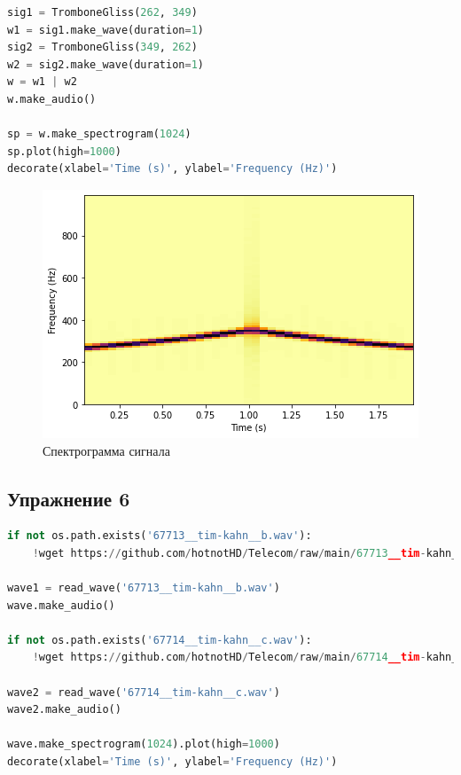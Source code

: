 \begin{lstlisting}[language=Python]
sig1 = TromboneGliss(262, 349)
w1 = sig1.make_wave(duration=1)
sig2 = TromboneGliss(349, 262)
w2 = sig2.make_wave(duration=1)
w = w1 | w2
w.make_audio()

sp = w.make_spectrogram(1024)
sp.plot(high=1000)
decorate(xlabel='Time (s)', ylabel='Frequency (Hz)')
\end{lstlisting}

\begin{figure}[H]
	\begin{center}
		\includegraphics[scale=1]{fig/lab03/lab03_13.png}
		\caption{Спектрограмма сигнала}
	\end{center}
\end{figure}

\subsection{Упражнение 6}


\begin{lstlisting}[language=Python]
if not os.path.exists('67713__tim-kahn__b.wav'):
    !wget https://github.com/hotnotHD/Telecom/raw/main/67713__tim-kahn__b.wav
    
wave1 = read_wave('67713__tim-kahn__b.wav')
wave.make_audio()

if not os.path.exists('67714__tim-kahn__c.wav'):
    !wget https://github.com/hotnotHD/Telecom/raw/main/67714__tim-kahn__c.wav
    
wave2 = read_wave('67714__tim-kahn__c.wav')
wave2.make_audio()

wave.make_spectrogram(1024).plot(high=1000)
decorate(xlabel='Time (s)', ylabel='Frequency (Hz)')
\end{lstlisting}

